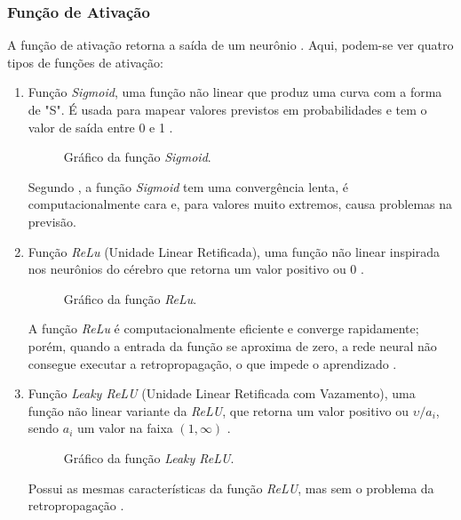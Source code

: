 \subsubsection*{Função de Ativação}

A função de ativação retorna a saída de um neurônio \cite{haykin1999neural}. Aqui, podem-se ver quatro tipos de funções de ativação:

\begin{enumerate}
	\item Função \textit{Sigmoid}, uma função não linear que produz uma curva com a forma de "S". É usada para mapear valores previstos em probabilidades e tem o valor de saída entre 0 e 1 \cite{gharat2019what}.
	\begin{figure}[ht]
	\caption{Gráfico da função \textit{Sigmoid}.}
	\begin{center}
	\end{center}
	\label{fig:grafico_sigmoid}
	\end{figure}
	Segundo , a função \textit{Sigmoid} tem uma convergência lenta, é computacionalmente cara e, para valores muito extremos, causa problemas na previsão.

	\item Função \textit{ReLu} (Unidade Linear Retificada), uma função não linear inspirada nos neurônios do cérebro que retorna um valor positivo ou 0 \cite{rizzo2020inteligencia}.
	\begin{figure}[ht]
	\caption{Gráfico da função \textit{ReLu}.}
	\begin{center}
	\end{center}
	\label{fig:grafico_relu}
	\end{figure}
	A função \textit{ReLu} é computacionalmente eficiente e converge rapidamente; porém, quando a entrada da função se aproxima de zero, a rede neural não consegue executar a retropropagação, o que impede o aprendizado \cite{gharat2019what}.

	\item Função \textit{Leaky ReLU} (Unidade Linear Retificada com Vazamento), uma função não linear variante da \textit{ReLU}, que retorna um valor positivo ou $\upsilon/a_i$, sendo $a_i$ um valor na faixa $(1,\infty)$ \cite{xu2015empirical}.
	\begin{figure}[ht]
	\caption{Gráfico da função \textit{Leaky ReLU}.}
	\begin{center}
	\end{center}
	\label{fig:grafico_relu_leaky}
	\end{figure}
	Possui as mesmas características da função \textit{ReLU}, mas sem o problema da retropropagação \cite{gharat2019what}.


\end{enumerate}
